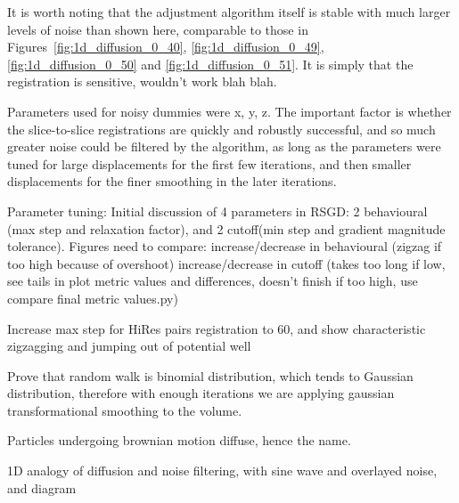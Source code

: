   It is worth noting that the adjustment algorithm itself is stable with much larger levels of noise than shown here, comparable to those in Figures~\ref{fig:1d_diffusion_0_40}, \ref{fig:1d_diffusion_0_49}, \ref{fig:1d_diffusion_0_50} and \ref{fig:1d_diffusion_0_51}. It is simply that the registration is sensitive, wouldn't work blah blah.
  
  Parameters used for noisy dummies were x, y, z. The important factor is whether the slice-to-slice registrations are quickly and robustly successful, and so much greater noise could be filtered by the algorithm, as long as the parameters were tuned for large displacements for the first few iterations, and then smaller displacements for the finer smoothing in the later iterations.
  
  Parameter tuning:
  Initial discussion of 4 parameters in RSGD: 2 behavioural (max step and relaxation factor), and 2 cutoff(min step and gradient magnitude tolerance).
  Figures need to compare:
    increase/decrease in behavioural (zigzag if too high because of overshoot)
  increase/decrease in cutoff (takes too long if low, see tails in plot metric values and differences, doesn't finish if too high, use compare final metric values.py)
  
  Increase max step for HiRes pairs registration to 60, and show characteristic zigzagging and jumping out of potential well
  
  Prove that random walk is binomial distribution, which tends to Gaussian distribution, therefore with enough iterations we are applying gaussian transformational smoothing to the volume.
  
  Particles undergoing brownian motion diffuse, hence the name.
  
  1D analogy of diffusion and noise filtering, with sine wave and overlayed noise, and diagram
    
